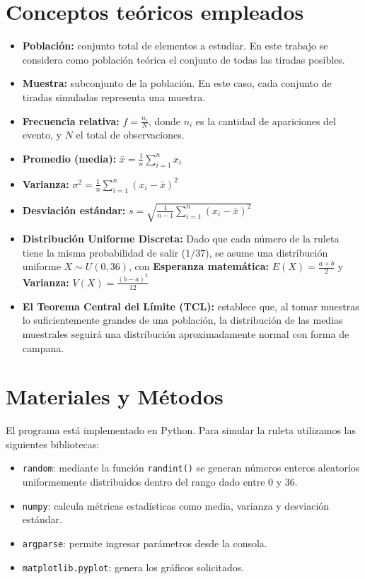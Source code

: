\documentclass{article}
\begin{document}
\section{Conceptos teóricos empleados}
\begin{itemize}
  \item \textbf{Población:} conjunto total de elementos a estudiar. En este trabajo se considera como población teórica el conjunto de todas las tiradas posibles.
  \item \textbf{Muestra:} subconjunto de la población. En este caso, cada conjunto de tiradas simuladas representa una muestra.
  \item \textbf{Frecuencia relativa:} \(f = \frac{n_i}{N}\), donde \(n_i\) es la cantidad de apariciones del evento, y \(N\) el total de observaciones.
  \item \textbf{Promedio (media):} \(\bar{x} = \frac{1}{n}\sum_{i=1}^{n} x_i\)
  \item \textbf{Varianza:} \(\sigma^2 = \frac{1}{n} \sum_{i=1}^{n} (x_i - \bar{x})^2\)
  \item \textbf{Desviación estándar:} \(s = \sqrt{\frac{1}{n - 1} \sum_{i=1}^{n} (x_i - \bar{x})^2}\)
  \item \textbf{Distribución Uniforme Discreta:} Dado que cada número de la ruleta tiene la misma probabilidad de salir ($1/37$), se asume una distribución uniforme \texttt{$X\sim U(0, 36)$}, con \textbf{Esperanza matemática:} $E(X)=\frac{a+b}{2}$ y \textbf{Varianza:} $V(X)=\frac{(b-a)^2}{12}$
  \item \textbf{El Teorema Central del Límite (TCL):} establece que, al tomar muestras lo suficientemente grandes de una población, la distribución de las medias muestrales seguirá una distribución aproximadamente normal con forma de campana.
\end{itemize}

\section{Materiales y Métodos}

El programa está implementado en Python. Para simular la ruleta utilizamos las siguientes bibliotecas:
\begin{itemize}
  \item \texttt{random}: mediante la función \texttt{randint()} se generan números enteros aleatorios uniformemente distribuidos dentro del rango dado entre 0 y 36.
  \item \texttt{numpy}: calcula métricas estadísticas como media, varianza y desviación estándar.
  \item \texttt{argparse}: permite ingresar parámetros desde la consola.
  \item \texttt{matplotlib.pyplot}: genera los gráficos solicitados.
\end{itemize}
\end{document}
